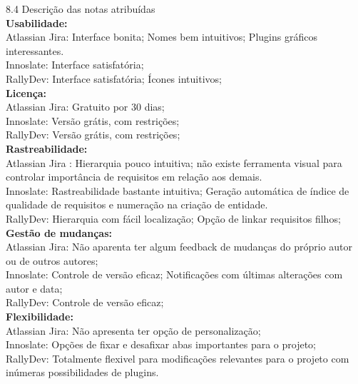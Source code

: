 {{\begin{longtable}{  c c c c }
\end{longtable}

{\large{8.4 Descrição das notas atribuídas}}\\

\textbf{Usabilidade:}\\
	\tab Atlassian Jira: Interface bonita; Nomes bem intuitivos; Plugins gráficos interessantes.\\
	\tab Innoslate: Interface satisfatória; \\
	\tab RallyDev: Interface satisfatória; Ícones intuitivos;\\

\textbf{Licença:}\\
	\tab Atlassian Jira: Gratuito por 30 dias;\\
	\tab Innoslate: Versão grátis, com restrições;\\
	\tab RallyDev: Versão grátis, com restrições;\\

\textbf{Rastreabilidade:}\\
	\tab Atlassian Jira : Hierarquia pouco intuitiva; não existe ferramenta visual para controlar importância de requisitos em relação aos demais.\\
	\tab Innoslate: Rastreabilidade bastante intuitiva; Geração automática de índice de qualidade de requisitos e numeração na criação de entidade.\\
	\tab RallyDev: Hierarquia com fácil localização; Opção de linkar requisitos filhos;\\

\textbf{Gestão de mudanças:}\\
	\tab Atlassian Jira: Não aparenta ter algum feedback de mudanças do próprio autor ou de outros autores;\\
	\tab Innoslate: Controle de versão eficaz; Notificações com últimas alterações com autor e data;\\
	\tab RallyDev: Controle de versão eficaz;\\

\textbf{Flexibilidade:} \\
	\tab Atlassian Jira: Não apresenta ter opção de personalização;\\
	\tab Innoslate: Opções de fixar e desafixar abas importantes para o projeto;\\
	\tab RallyDev: Totalmente flexivel para modificações relevantes para o projeto com inúmeras possibilidades de plugins.\\

}}
